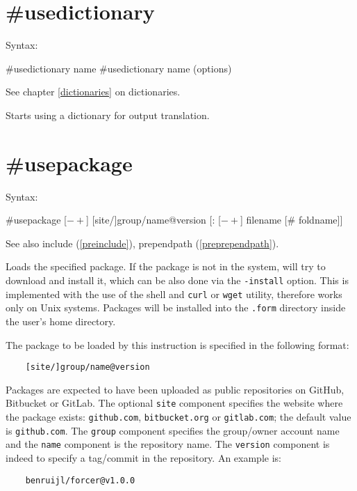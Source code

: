  
\section{\#usedictionary}
\label{preusedictionary}

\noindent Syntax:

\#usedictionary name
\#usedictionary name (options)
 
\noindent See chapter \ref{dictionaries} on dictionaries.

\noindent Starts using a dictionary for output translation.


\section{\#usepackage}
\label{preusepackage}

\noindent Syntax:

\#usepackage [$-+$] [site/]group/name@version [: [$-+$] filename [\# foldname]]
 
\noindent See also include (\ref{preinclude}), 
          prependpath (\ref{preprependpath}).

\noindent Loads the specified package. If the package is 
not in the system, \FORM{} will try to download and install it, which can be 
also done via the {\tt -install} option. This is implemented with the use of 
the shell and {\tt curl} or {\tt wget} utility, therefore works only on Unix 
systems. Packages will be installed into the {\tt .form} directory inside the 
user's home directory.

The package to be loaded by this instruction is specified in the following 
format:
\begin{verbatim}
    [site/]group/name@version
\end{verbatim}
Packages are expected to have been uploaded as public repositories on GitHub, 
Bitbucket or GitLab. The optional {\tt site} component specifies the website 
where the package exists: {\tt github.com}, {\tt bitbucket.org} or 
{\tt gitlab.com}; the default value is {\tt github.com}. The {\tt group} 
component specifies the group/owner account name and the {\tt name} component 
is the repository name. The {\tt version} component is indeed to specify a 
tag/commit in the repository. An example is:
\begin{verbatim}
    benruijl/forcer@v1.0.0
\end{verbatim}

